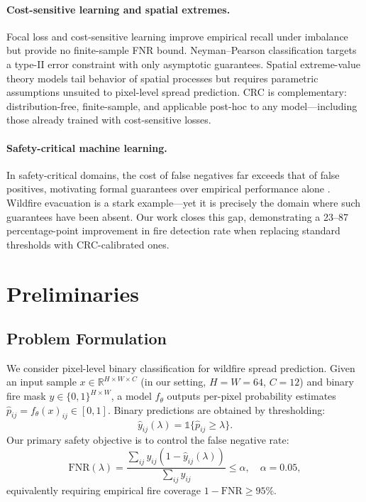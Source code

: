 \documentclass{article}
\begin{document}
\paragraph{Cost-sensitive learning and spatial extremes.}
Focal loss \citep{lin2017focal} and cost-sensitive learning \citep{elkan2001foundations} improve empirical recall under imbalance but provide no finite-sample FNR bound.
Neyman--Pearson classification \citep{scott2005neyman} targets a type-II error constraint with only asymptotic guarantees.
Spatial extreme-value theory \citep{coles2001introduction, davison2012statistical} models tail behavior of spatial processes but requires parametric assumptions unsuited to pixel-level spread prediction.
CRC is complementary: distribution-free, finite-sample, and applicable post-hoc to any model---including those already trained with cost-sensitive losses.

\paragraph{Safety-critical machine learning.}
In safety-critical domains, the cost of false negatives far exceeds that of false positives, motivating formal guarantees over empirical performance alone \citep{amodei2016concrete}.
Wildfire evacuation is a stark example---yet it is precisely the domain where such guarantees have been absent.
Our work closes this gap, demonstrating a 23--87 percentage-point improvement in fire detection rate when replacing standard thresholds with CRC-calibrated ones.


\section{Preliminaries}
\label{sec:prelim}

\subsection{Problem Formulation}

We consider pixel-level binary classification for wildfire spread prediction.
Given an input sample $x \in \mathbb{R}^{H \times W \times C}$ (in our setting, $H{=}W{=}64$, $C{=}12$) and binary fire mask $y \in \{0,1\}^{H \times W}$, a model $f_\theta$ outputs per-pixel probability estimates $\hat{p}_{ij} = f_\theta(x)_{ij} \in [0,1]$.
Binary predictions are obtained by thresholding:
\begin{equation}
    \hat{y}_{ij}(\lambda) = \mathbb{1}\{\hat{p}_{ij} \ge \lambda\}.
\end{equation}
Our primary safety objective is to control the false negative rate:
\begin{equation}
    \mathrm{FNR}(\lambda) = \frac{\sum_{ij} y_{ij}(1 - \hat{y}_{ij}(\lambda))}{\sum_{ij} y_{ij}} \le \alpha, \quad \alpha = 0.05,
    \label{eq:fnr}
\end{equation}
equivalently requiring empirical fire coverage $1 - \mathrm{FNR} \ge 95\%$.
\end{document}
